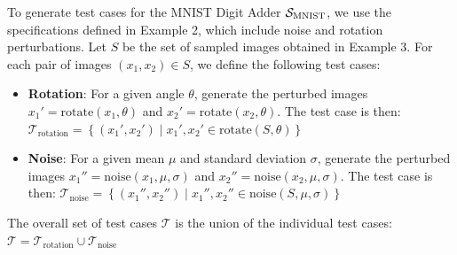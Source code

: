 \documentclass[10pt, conference, a4paper, final]{IEEEtran}
\begin{document}
  \begin{example}
    To generate test cases for the MNIST Digit Adder $\S_{\text{MNIST}}$, we use the specifications defined in Example 2, which include noise and rotation perturbations. Let $S$ be the set of sampled images obtained in Example 3. For each pair of images $(x_1, x_2) \in S$, we define the following test cases:
    \begin{itemize}
        \item \textbf{Rotation}: For a given angle $\theta$, generate the perturbed images $x_1' = \text{rotate}(x_1, \theta)$ and $x_2' = \text{rotate}(x_2, \theta)$. The test case is then:
        $\mathcal{T}_{\text{rotation}} = \left\{(x_1', x_2') \mid x_1', x_2' \in \text{rotate}(S, \theta)\right\}$
        \item \textbf{Noise}: For a given mean $\mu$ and standard deviation $\sigma$, generate the perturbed images $x_1'' = \text{noise}(x_1, \mu, \sigma)$ and $x_2'' = \text{noise}(x_2, \mu, \sigma)$. The test case is then:
        $\mathcal{T}_{\text{noise}} = \left\{(x_1'', x_2'') \mid x_1'', x_2'' \in \text{noise}(S, \mu, \sigma)\right\}$
    \end{itemize}
    The overall set of test cases $\mathcal{T}$ is the union of the individual test cases:
    $\mathcal{T} = \mathcal{T}_{\text{rotation}} \cup \mathcal{T}_{\text{noise}}$
   
\end{example}



\end{document}
